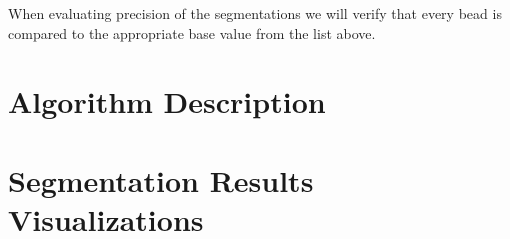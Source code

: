 \documentclass{InsightArticle}
\begin{document}
When evaluating precision of the segmentations we will verify that every bead
is compared to the appropriate base value from the list above.

\section{Algorithm Description}

\section{Segmentation Results Visualizations}




\small
\listoffigures
\listoftables
\normalsize
\end{document}
